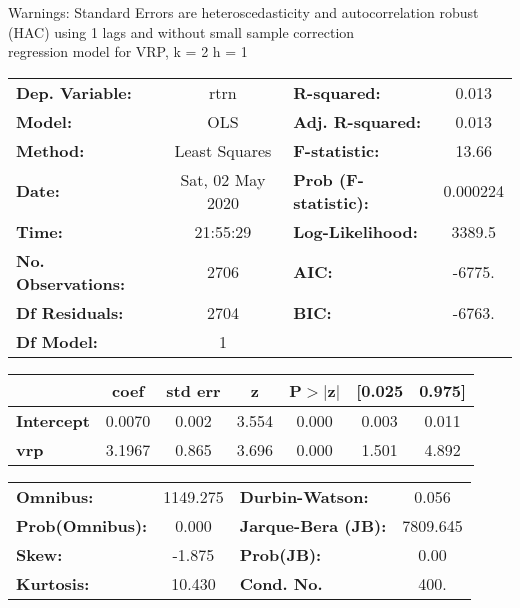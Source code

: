 Warnings: \newline
 [1] Standard Errors are heteroscedasticity and autocorrelation robust (HAC) using 1 lags and without small sample correction\\ 

regression model for VRP, k = 2 h = 1\begin{center}
\begin{tabular}{lclc}
\toprule
\textbf{Dep. Variable:}    &       rtrn       & \textbf{  R-squared:         } &     0.013   \\
\textbf{Model:}            &       OLS        & \textbf{  Adj. R-squared:    } &     0.013   \\
\textbf{Method:}           &  Least Squares   & \textbf{  F-statistic:       } &     13.66   \\
\textbf{Date:}             & Sat, 02 May 2020 & \textbf{  Prob (F-statistic):} &  0.000224   \\
\textbf{Time:}             &     21:55:29     & \textbf{  Log-Likelihood:    } &    3389.5   \\
\textbf{No. Observations:} &        2706      & \textbf{  AIC:               } &    -6775.   \\
\textbf{Df Residuals:}     &        2704      & \textbf{  BIC:               } &    -6763.   \\
\textbf{Df Model:}         &           1      & \textbf{                     } &             \\
\bottomrule
\end{tabular}
\begin{tabular}{lcccccc}
                   & \textbf{coef} & \textbf{std err} & \textbf{z} & \textbf{P$> |$z$|$} & \textbf{[0.025} & \textbf{0.975]}  \\
\midrule
\textbf{Intercept} &       0.0070  &        0.002     &     3.554  &         0.000        &        0.003    &        0.011     \\
\textbf{vrp}       &       3.1967  &        0.865     &     3.696  &         0.000        &        1.501    &        4.892     \\
\bottomrule
\end{tabular}
\begin{tabular}{lclc}
\textbf{Omnibus:}       & 1149.275 & \textbf{  Durbin-Watson:     } &    0.056  \\
\textbf{Prob(Omnibus):} &   0.000  & \textbf{  Jarque-Bera (JB):  } & 7809.645  \\
\textbf{Skew:}          &  -1.875  & \textbf{  Prob(JB):          } &     0.00  \\
\textbf{Kurtosis:}      &  10.430  & \textbf{  Cond. No.          } &     400.  \\
\bottomrule
\end{tabular}
\end{center}

